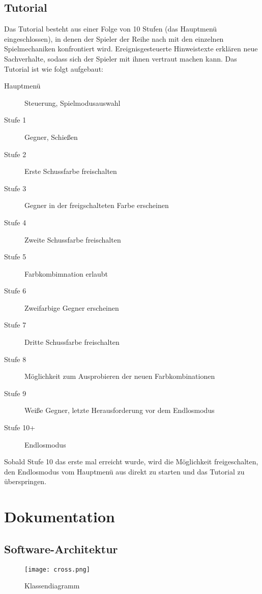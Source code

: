 \documentclass[a4paper,10pt,ngerman,fontsize=12pt]{scrreprt}
\begin{document}
\section{Tutorial}

Das Tutorial besteht aus einer Folge von 10 Stufen (das Hauptmenü eingeschlossen), in denen der Spieler der Reihe nach mit den einzelnen Spielmechaniken konfrontiert wird. Ereignisgesteuerte Hinweistexte erklären neue Sachverhalte, sodass sich der Spieler mit ihnen vertraut machen kann. Das Tutorial ist wie folgt aufgebaut:

\begin{description}
\item[Hauptmenü] Steuerung, Spielmodusauswahl
\item[Stufe 1] Gegner, Schie{\ss}en
\item[Stufe 2] Erste Schussfarbe freischalten
\item[Stufe 3] Gegner in der freigschalteten Farbe erscheinen
\item[Stufe 4] Zweite Schussfarbe freischalten
\item[Stufe 5] Farbkombimnation erlaubt
\item[Stufe 6] Zweifarbige Gegner erscheinen
\item[Stufe 7] Dritte Schussfarbe freischalten
\item[Stufe 8] Möglichkeit zum Ausprobieren der neuen Farbkombinationen
\item[Stufe 9] Wei{\ss}e Gegner, letzte Herausforderung vor dem Endlosmodus
\item[Stufe 10+] Endlosmodus
\end{description}

Sobald Stufe 10 das erste mal erreicht wurde, wird die Möglichkeit freigeschalten, den Endlosmodus vom Hauptmenü aus direkt zu starten und das Tutorial zu überspringen.



\chapter{Dokumentation}




\section{Software-Architektur}

\lipsum[1]

\begin{figure}[h!]
\begin{center}
\texttt{[image: cross.png]}
\caption{Klassendiagramm}
\label{fig:classdiag}
\end{center}
\end{figure}
    
\end{document}
